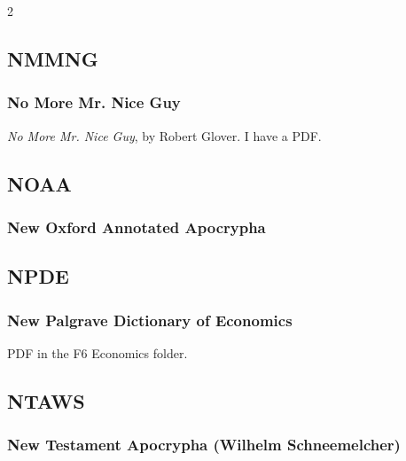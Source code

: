 \begin{multicols}{2}
	\subsection*{NMMNG}
	
		\subsubsection*{No More Mr. Nice Guy}
		
			\textit{No More Mr. Nice Guy}, by Robert Glover. I have a PDF.
			
	\subsection*{NOAA}
	
		\subsubsection*{New Oxford Annotated Apocrypha}
		
			\phantom{.}
			
	\subsection*{NPDE}
	
		\subsubsection*{New Palgrave Dictionary of Economics}
		
			PDF in the F6 Economics folder.
			
	\subsection*{NTAWS}
	
		\subsubsection*{New Testament Apocrypha (Wilhelm Schneemelcher)}
		

\end{multicols}
